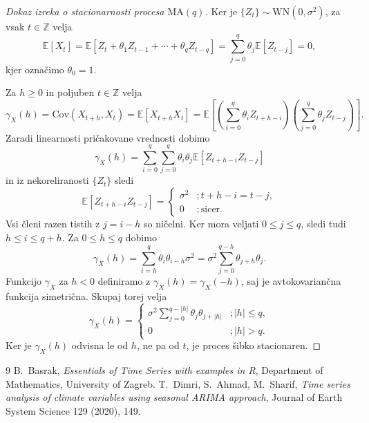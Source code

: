 \documentclass[11pt]{amsart}
\newcommand{\Z}{\mathbb{Z}}
\newcommand{\E}{\mathbb{E}}
\newcommand{\Cov}{\mathrm{Cov}}
\newcommand{\WN}{\mathrm{WN}}
\theoremstyle{definition}
\theoremstyle{plain}
\begin{document}
\begin{proof}[Dokaz izreka o stacionarnosti procesa $\mathrm{MA}(q)$]
    Ker je $\{Z_t\} \sim \WN(0, \sigma^2)$, za vsak $t \in \Z$ velja
    \[
        \E[X_t] = \E[Z_t + \theta_1 Z_{t-1} + \cdots + \theta_q Z_{t-q}] 
        = \sum_{j=0}^{q} \theta_j \E[Z_{t-j}] = 0,
    \]
    kjer označimo $\theta_0 = 1$.

    Za $h \geq 0$ in poljuben $t \in \Z$ velja
    \[
        \gamma_X(h) = \Cov(X_{t+h}, X_t) = \E[X_{t+h} X_t] 
        = \E\left[ \left(\sum_{i=0}^{q} \theta_i Z_{t+h-i}\right)
        \left(\sum_{j=0}^{q} \theta_j Z_{t-j}\right) \right].
    \]
    Zaradi linearnosti pričakovane vrednosti dobimo
    \[
        \gamma_X(h) = \sum_{i=0}^{q} \sum_{j=0}^{q} \theta_i \theta_j \E[Z_{t+h-i} Z_{t-j}]
    \]
    in iz nekoreliranosti $\{Z_t\}$ sledi
    \[
        \E[Z_{t+h-i} Z_{t-j}] = 
            \begin{cases}
                \sigma^2 &; t+h-i = t-j,  \\
                0 &; \text{sicer}.
            \end{cases}
    \]
    Vsi členi razen tistih z $j = i - h$ so ničelni. Ker mora veljati $0 \leq j \leq q$, 
    sledi tudi $h \leq i \leq q + h$. Za $0 \leq h \leq q$ dobimo
    \[
        \gamma_X(h) = \sum_{i=h}^{q} \theta_i \theta_{i-h} \sigma^2
                   = \sigma^2 \sum_{j=0}^{q-h} \theta_{j+h} \theta_j.
    \]
    Funkcijo $\gamma_X$ za $h < 0$ definiramo z $\gamma_X(h) = \gamma_X(-h)$, saj je
    avtokovariančna funkcija simetrična. Skupaj torej velja
    \[
        \gamma_X(h) = 
        \begin{cases}
            \sigma^2 \sum_{j=0}^{q-|h|} \theta_j \theta_{j+|h|} &; |h| \leq q, \\
            0 &; |h| > q.
        \end{cases}
    \]
    Ker je $\gamma_X(h)$ odvisna le od $h$, ne pa od $t$, je proces šibko stacionaren.
\end{proof}

\begin{thebibliography}{9}
     B.~Basrak, \emph{Essentials of Time Series with examples in R},
    Department of Mathematics, University of Zagreb.
     T.~Dimri, S.~Ahmad, M.~Sharif,
    \emph{Time series analysis of climate variables using seasonal ARIMA approach},
    Journal of Earth System Science 129 (2020), 149.
\end{thebibliography}
\end{document}
